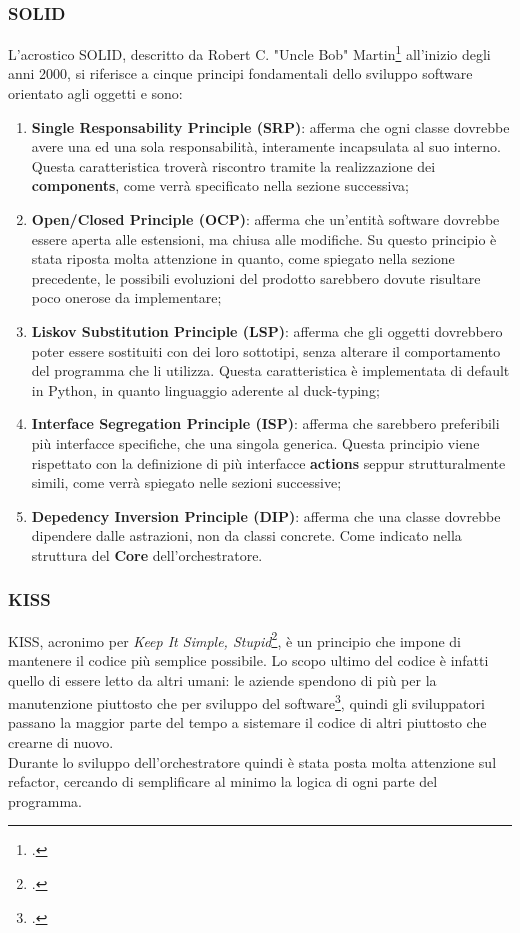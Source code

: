 \subsubsection{SOLID}
L'acrostico SOLID, descritto da Robert C. "Uncle Bob" Martin\footcite{book:designprinciples} all'inizio degli anni 2000, si riferisce a cinque principi fondamentali dello sviluppo software orientato agli oggetti e sono:
\begin{enumerate}
	\item \textbf{Single Responsability Principle (SRP)}: afferma che ogni classe dovrebbe avere una ed una sola responsabilità, interamente incapsulata al suo interno. Questa caratteristica troverà riscontro tramite la realizzazione dei \textbf{components}, come verrà specificato nella sezione successiva;
	\item \textbf{Open/Closed Principle (OCP)}: afferma che un'entità software dovrebbe essere aperta alle estensioni, ma chiusa alle modifiche. Su questo principio è stata riposta molta attenzione in quanto, come spiegato nella sezione precedente, le possibili evoluzioni del prodotto sarebbero dovute risultare poco onerose da implementare;
	\item \textbf{Liskov Substitution Principle (LSP)}: afferma che gli oggetti dovrebbero poter essere sostituiti con dei loro sottotipi, senza alterare il comportamento del programma che li utilizza. Questa caratteristica è implementata di default in Python, in quanto linguaggio aderente al \gls{duck-typing};
	\item \textbf{Interface Segregation Principle (ISP)}: afferma che sarebbero preferibili più interfacce specifiche, che una singola generica. Questa principio viene rispettato con la definizione di più interfacce \textbf{actions} seppur strutturalmente simili, come verrà spiegato nelle sezioni successive;
	\item \textbf{Depedency Inversion Principle (DIP)}: afferma che una classe dovrebbe dipendere dalle astrazioni, non da classi concrete. Come indicato nella struttura del \textbf{Core} dell'orchestratore.
\end{enumerate} 
\subsubsection{KISS}
KISS, acronimo per \textit{Keep It Simple, Stupid}\footcite{article:drykiss}, è un principio che impone di mantenere il codice più semplice possibile. Lo scopo ultimo del codice è infatti quello di essere letto da altri umani: le aziende spendono di più per la manutenzione piuttosto che per sviluppo del software\footcite{article:maintenancesurvey}, quindi gli sviluppatori passano la maggior parte del tempo a sistemare il codice di altri piuttosto che crearne di nuovo.\\
Durante lo sviluppo dell'orchestratore quindi è stata posta molta attenzione sul \gls{refactor}, cercando di semplificare al minimo la logica di ogni parte del programma.
